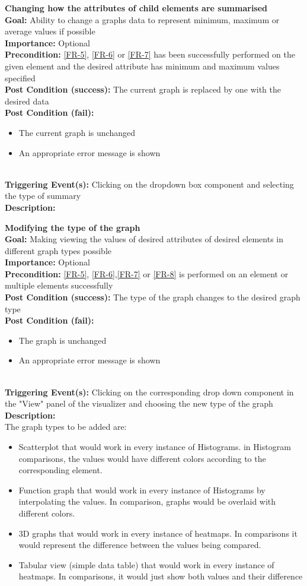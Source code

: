 \documentclass[10pt,a4paper]{report}
\newcommand{\precondition}[1]{
    \textbf{Precondition: } #1 \leavevmode \\
}
\newcommand{\FRODescription}[8]{
    \textbf{#1} \leavevmode \\
    \textbf{Goal: } #2 \leavevmode \\
    \textbf{Importance: } #3 \leavevmode \\
    \precondition{#4}
    \textbf{Post Condition (success): } #5 \leavevmode \\
    \textbf{Post Condition (fail): } #6 \leavevmode \\
    \textbf{Triggering Event(s): } #7 \leavevmode \\
    \textbf{Description: } \leavevmode \\
    #8}
\begin{document}
\begin{FRO}
    \item \FRODescription{Changing how the attributes of child elements are summarised\label{FRO-14}}
    {Ability to change a graphs data to represent minimum, maximum or average values if possible}
    {Optional}
    {\ref{FR-5}, \ref{FR-6} or \ref{FR-7} has been successfully performed on the given element and the desired attribute has minimum and maximum values specified}
    {The current graph is replaced by one with the desired data}
    {\begin{itemize}
        \item The current graph is unchanged
        \item An appropriate error message is shown
    \end{itemize}}
    {Clicking on the dropdown box component and selecting the type of summary}
    \item \FRODescription{Modifying the type of the graph\label{FRO-15}}
    {Making viewing the values of desired attributes of desired elements in different graph types possible}
    {Optional}
    {\ref{FR-5}, \ref{FR-6},\ref{FR-7} or \ref{FR-8} is performed on an element or multiple elements successfully}
    {The type of the graph changes to the desired graph type}
    {\begin{itemize}
        \item The graph is unchanged
        \item An appropriate error message is shown
    \end{itemize}}
    {Clicking on the corresponding drop down component in the "View" panel of the visualizer and choosing the new type of the graph}
    {The graph types to be added are:
    \begin{itemize}
        \item Scatterplot that would work in every instance of Histograms. in Histogram comparisons, the values would have different colors according to the corresponding element.
        \item Function graph that would work in every instance of Histograms by interpolating the values. In comparison, graphs would be overlaid with different colors.
        \item 3D graphs that would work in every instance of heatmaps. In comparisons it would represent the difference between the values being compared.
        \item Tabular view (simple data table) that would work in every instance of heatmaps. In comparisons, it would just show both values and their difference

\end{itemize}}
\end{FRO}
\end{document}
